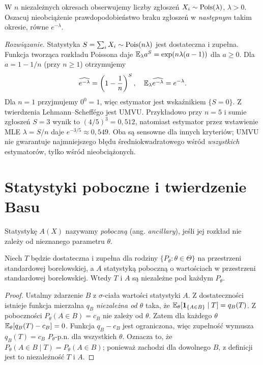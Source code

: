 \begin{zadanie}
\label{zad:umvu-pois-zero}
W $n$ niezależnych okresach obserwujemy liczby zgłoszeń
$X_i\sim\operatorname{Pois}(\lambda)$, $\lambda>0$. Oszacuj nieobciążenie
prawdopodobieństwo braku zgłoszeń w \emph{następnym} takim
okresie, równe $e^{-\lambda}$.
\par\emph{Rozwiązanie.} Statystyka $S=\sum_iX_i\sim\operatorname{Pois}(n\lambda)$
jest dostateczna i zupełna. Funkcja tworząca rozkładu Poissona
daje $\mathbb E_\lambda a^S=\exp(n\lambda(a-1))$ dla $a\ge0$.
Dla $a=1-1/n$ (przy $n\ge1$) otrzymujemy
\[
\widehat{e^{-\lambda}}=\left(1-\frac1n\right)^S,
\quad \mathbb E_\lambda\widehat{e^{-\lambda}}=e^{-\lambda}.
\]
Dla $n=1$ przyjmujemy $0^0=1$, więc estymator jest wskaźnikiem
$\{S=0\}$. Z twierdzenia Lehmann--Scheffégo jest UMVU.
Przykładowo przy $n=5$ i sumie zgłoszeń $S=3$ wynik to
$(4/5)^3=0{,}512$, natomiast estymator przez wstawienie MLE
$\lambda=S/n$ daje $e^{-3/5}\approx0{,}549$.
Oba są sensowne dla innych kryteriów; UMVU nie gwarantuje
najmniejszego błędu średniokwadratowego wśród \emph{wszystkich}
estymatorów, tylko wśród nieobciążonych.
\end{zadanie}

\section{Statystyki poboczne i twierdzenie Basu}
\begin{definicja}
Statystykę $A(X)$ nazywamy \emph{poboczną} (ang. \emph{ancillary}),
jeśli jej rozkład nie zależy od nieznanego parametru $\theta$.
\end{definicja}

\begin{twierdzenie}\label{thm:basu}
Niech $T$ będzie dostateczna i zupełna dla rodziny
$\{P_\theta:\theta\in\Theta\}$ na przestrzeni standardowej
borelowskiej, a $A$ statystyką poboczną o wartościach w przestrzeni
standardowej borelowskiej. Wtedy $T$ i $A$ są niezależne
pod każdym $P_\theta$.
\end{twierdzenie}
\begin{proof}
Ustalmy zdarzenie $B$ z $\sigma$-ciała wartości statystyki $A$.
Z dostateczności istnieje funkcja mierzalna $q_B$ \emph{niezależna
od $\theta$} taka, że
$\mathbb E_\theta[\mathbf 1_{\{A\in B\}}\mid T]=q_B(T)$.
Z poboczności $P_\theta(A\in B)=c_B$ nie zależy od $\theta$.
Zatem dla każdego $\theta$
$\mathbb E_\theta[q_B(T)-c_B]=0$.
Funkcja $q_B-c_B$ jest ograniczona, więc zupełność wymusza
$q_B(T)=c_B$ $P_\theta$-p.n. dla wszystkich $\theta$.
Oznacza to, że
$P_\theta(A\in B\mid T)=P_\theta(A\in B)$;
ponieważ zachodzi dla dowolnego $B$, z definicji jest to
niezależność $T$ i $A$.
\end{proof}

